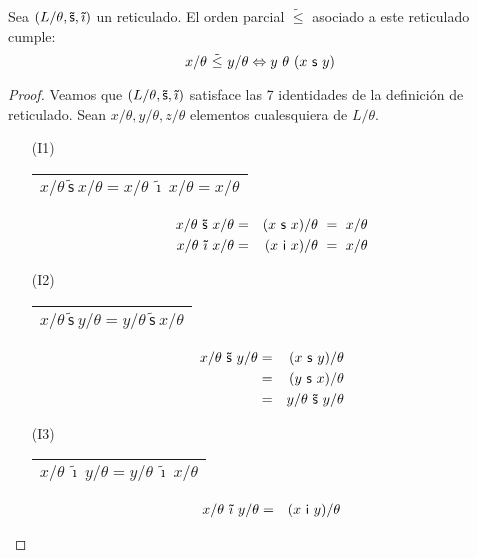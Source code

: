   \begin{lemma} \label{lemma_8}
    \PN Sea $(L/\theta, \mathsf{\tilde{s}}, \mathsf{\tilde{\imath}})$ un reticulado. El orden parcial $\tilde{\leq}$ asociado a este reticulado cumple:
    \[
      x/\theta \ \tilde{\leq} \ y/\theta \Leftrightarrow y \ \theta \ (x \ \SU \ y)
    \]
  \end{lemma}
  \begin{proof}
    \PN Veamos que $(L/\theta, \mathsf{\tilde{s}}, \mathsf{\tilde{\imath}})$ satisface las 7 identidades de la
    definición de reticulado. Sean $x/\theta, y/\theta, z/\theta$ elementos cualesquiera de $L/\theta$.
    \begin{multicols}{2}
      \begin{enumerate}
        \item[(I1)] \begin{tabular}{|c|} \hline $x/\theta \ \mathsf{\tilde{s}} \ x/\theta = x/\theta \
          \mathsf{\tilde{\imath}} \ x/\theta = x/\theta$ \\\hline \end{tabular}
          \begin{eqnarray*}
            x/\theta \ \mathsf{\tilde{s}} \ x/\theta &=& (x \ \SU \ x)/\theta \ =\ x /\theta \\
            x/\theta \ \mathsf{\tilde{\imath}} \ x/\theta &=& (x \ \IN \ x)/\theta \ = \ x /\theta
          \end{eqnarray*}
        \item[(I2)] \begin{tabular}{|c|} \hline $x/\theta \ \mathsf{\tilde{s}} \ y/\theta = y/\theta \
          \mathsf{\tilde{s}} \ x/\theta$ \\\hline \end{tabular}
          \begin{eqnarray*}
            x/\theta \ \mathsf{\tilde{s}} \ y/\theta &=& (x \ \SU \ y)/\theta \\
            &=& (y \ \SU \ x)/\theta \\
            &=& y/\theta \ \mathsf{\tilde{s}} \ y/\theta
          \end{eqnarray*}
        \item[(I3)] \begin{tabular}{|c|} \hline $x/\theta \ \mathsf{\tilde{\imath}} \ y/\theta = y/\theta \
          \mathsf{\tilde{\imath}} \ x/\theta$ \\\hline \end{tabular}
          \begin{eqnarray*}
            x/\theta \ \mathsf{\tilde{\imath}} \ y/\theta &=& (x \ \IN \ y)/\theta \\

\end{eqnarray*}
\end{enumerate}
\end{multicols}
\end{proof}
